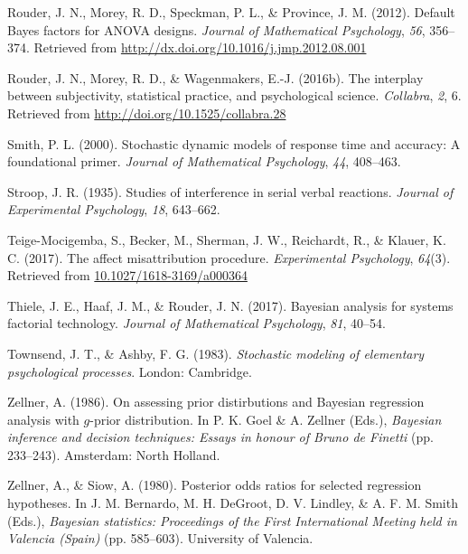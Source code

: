\documentclass[english,,man]{apa6}
\begin{document}
\leavevmode\hypertarget{ref-Rouder:etal:2012}{}%
Rouder, J. N., Morey, R. D., Speckman, P. L., \& Province, J. M. (2012). Default Bayes factors for ANOVA designs. \emph{Journal of Mathematical Psychology}, \emph{56}, 356--374. Retrieved from \url{http://dx.doi.org/10.1016/j.jmp.2012.08.001}

\leavevmode\hypertarget{ref-Rouder:etal:2016b}{}%
Rouder, J. N., Morey, R. D., \& Wagenmakers, E.-J. (2016b). The interplay between subjectivity, statistical practice, and psychological science. \emph{Collabra}, \emph{2}, 6. Retrieved from \url{http://doi.org/10.1525/collabra.28}

\leavevmode\hypertarget{ref-Smith:2000}{}%
Smith, P. L. (2000). Stochastic dynamic models of response time and accuracy: A foundational primer. \emph{Journal of Mathematical Psychology}, \emph{44}, 408--463.

\leavevmode\hypertarget{ref-Stroop:1935}{}%
Stroop, J. R. (1935). Studies of interference in serial verbal reactions. \emph{Journal of Experimental Psychology}, \emph{18}, 643--662.

\leavevmode\hypertarget{ref-Teige-Mocigemba:etal:2017}{}%
Teige-Mocigemba, S., Becker, M., Sherman, J. W., Reichardt, R., \& Klauer, K. C. (2017). The affect misattribution procedure. \emph{Experimental Psychology}, \emph{64}(3). Retrieved from \url{10.1027/1618-3169/a000364}

\leavevmode\hypertarget{ref-Thiele:etal:2017}{}%
Thiele, J. E., Haaf, J. M., \& Rouder, J. N. (2017). Bayesian analysis for systems factorial technology. \emph{Journal of Mathematical Psychology}, \emph{81}, 40--54.

\leavevmode\hypertarget{ref-Townsend:Ashby:1983}{}%
Townsend, J. T., \& Ashby, F. G. (1983). \emph{Stochastic modeling of elementary psychological processes}. London: Cambridge.

\leavevmode\hypertarget{ref-Zellner:1986}{}%
Zellner, A. (1986). On assessing prior distirbutions and Bayesian regression analysis with \(g\)-prior distribution. In P. K. Goel \& A. Zellner (Eds.), \emph{Bayesian inference and decision techniques: Essays in honour of Bruno de Finetti} (pp. 233--243). Amsterdam: North Holland.

\leavevmode\hypertarget{ref-Zellner:Siow:1980}{}%
Zellner, A., \& Siow, A. (1980). Posterior odds ratios for selected regression hypotheses. In J. M. Bernardo, M. H. DeGroot, D. V. Lindley, \& A. F. M. Smith (Eds.), \emph{Bayesian statistics: Proceedings of the First International Meeting held in Valencia (Spain)} (pp. 585--603). University of Valencia.
\end{document}
